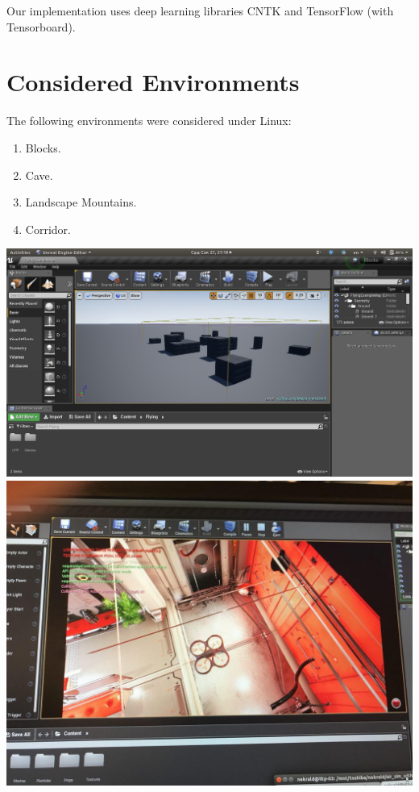 \documentclass{article}
\begin{document}
Our implementation uses deep learning libraries CNTK
and TensorFlow (with Tensorboard).

\section{Considered Environments}

The following environments were considered under Linux:
\begin{enumerate}
    \item Blocks.
    \item Cave.
    \item Landscape Mountains.
    \item Corridor.
\end{enumerate}

 \includegraphics[scale=0.1]{environments/blocks.png}
 \includegraphics[scale=0.1]{environments/corridor.jpg}
\end{document}
